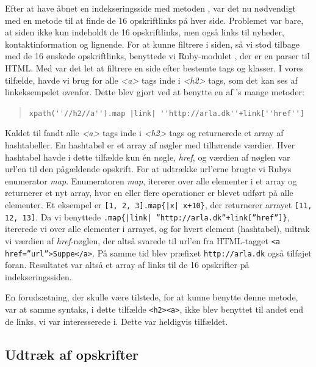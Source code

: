 Efter at have åbnet en indekseringsside med metoden , var det nu nødvendigt med en metode til at finde de 16 opskriftlinks på hver side. Problemet var bare, at siden ikke kun indeholdt de 16 opskriftlinks, men også links til nyheder, kontaktinformation og lignende. For at kunne filtrere i siden, så vi stod tilbage med de 16 ønskede opskriftlinks, benyttede vi Ruby-modulet \cite{rubygemnokogiri}, der er en parser til HTML. Med  var det let at filtrere en side efter bestemte tags og klasser. I vores tilfælde, havde vi brug for alle \textit{<a>} tags inde i \textit{<h2>} tags, som det kan ses af linkeksempelet ovenfor. Dette blev gjort ved at benytte en af 's mange metoder:

\begin{quote} 
 \lstinline{xpath(''//h2//a'').map |link| ''http://arla.dk''+link[''href'']}
\end{quote}

Kaldet til  fandt alle \textit{<a>} tags inde i \textit{<h2>} tags og returnerede et array af hashtabeller. En hashtabel er et array af nøgler med tilhørende værdier. Hver hashtabel havde i dette tilfælde kun én nøgle, \textit{href}, og værdien af nøglen var url'en til den pågældende opskrift. For at udtrække url'erne brugte vi Rubys enumerator \textit{map}. Enumeratoren \textit{map}, itererer over alle elementer i et array og returnerer et nyt array, hvor en eller flere operationer er blevet udført på alle elementer\cite{rubydoc}. Et eksempel er \texttt{[1, 2, 3].map\{|x| x+10\}}, der returnerer arrayet \texttt{[11, 12, 13]}. Da vi benyttede \texttt{.map\{|link| ''http://arla.dk''+link[''href'']\}}, itererede vi over alle elementer i arrayet, og for hvert element (hashtabel), udtrak vi værdien af \textit{href}-nøglen, der altså svarede til url'en fra HTML-tagget \texttt{<a href=''url''>Suppe</a>}. På samme tid blev præfixet \texttt{http://arla.dk} også tilføjet foran. Resultatet var altså et array af links til de 16 opskrifter på indekseringssiden.

En forudsætning, der skulle være tilstede, for at kunne benytte denne metode, var at samme syntaks, i dette tilfælde \lstinline{<h2><a>}, ikke blev benyttet til andet end de links, vi var interesserede i. Dette var heldigvis tilfældet.


\subsection{Udtræk af opskrifter}

